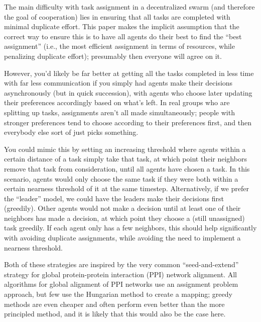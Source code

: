 \documentclass[11pt]{article}
\begin{document}
The main difficulty with task assignment in a decentralized swarm (and therefore the goal of cooperation) lies in ensuring that all tasks are completed with minimal duplicate effort. This paper makes the implicit assumption that the correct way to ensure this is to have all agents do their best to find the ``best assignment'' (i.e., the most efficient assignment in terms of resources, while penalizing duplicate effort); presumably then everyone will agree on it.

However, you'd likely be far better at getting all the tasks completed in less time with far less communication if you simply had agents make their decisions asynchronously (but in quick succession), with agents who choose later updating their preferences accordingly based on what's left. In real groups who are splitting up tasks, assignments aren't all made simultaneously; people with stronger preferences tend to choose according to their preferences first, and then everybody else sort of just picks something.

You could mimic this by setting an increasing threshold where agents within a certain distance of a task simply take that task, at which point their neighbors remove that task from consideration, until all agents have chosen a task. In this scenario, agents would only choose the same task if they were both within a certain nearness threshold of it at the same timestep. Alternatively, if we prefer the ``leader'' model, we could have the leaders make their decisions first (greedily). Other agents would not make a decision until at least one of their neighbors has made a decision, at which point they choose a (still unassigned) task greedily. If each agent only has a few neighbors, this should help significantly with avoiding duplicate assignments, while avoiding the need to implement a nearness threshold.

Both of these strategies are inspired by the very common ``seed-and-extend'' strategy for global protein-protein interaction (PPI) network alignment. All algorithms for global alignment of PPI networks use an assignment problem approach, but few use the Hungarian method to create a mapping; greedy methods are even cheaper and often perform even better than the more principled method, and it is likely that this would also be the case here.
\end{document}
